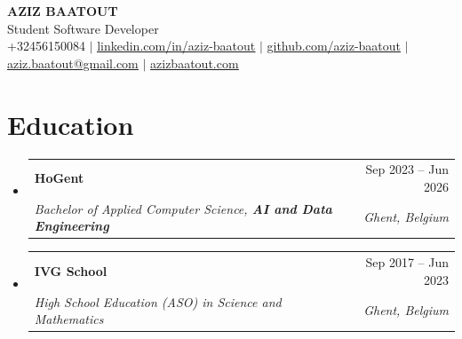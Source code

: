 \documentclass[letterpaper,11pt]{article}
\makeatletter
\newcommand{\resumeSubheading}[4]{
  \vspace{-2pt}\item
    \begin{tabular*}{0.97\textwidth}[t]{l@{\extracolsep{\fill}}r}
      \textbf{#1} & #2 \\
      \textit{\small#3} & \textit{\small #4} \\
    \end{tabular*}\vspace{-7pt}
}
\newcommand{\resumeSubHeadingListStart}{\begin{itemize}[leftmargin=0.15in, label={}]}
\newcommand{\resumeSubHeadingListEnd}{\end{itemize}}
\makeatother
\begin{document}
\begin{center}
    \textbf{\Huge \scshape AZIZ BAATOUT} \\ \vspace{1pt}
    \small Student Software Developer \\ \vspace{2pt}
    \small +32456150084 $|$ 
    \href{https://linkedin.com/in/aziz-baatout}{\underline{linkedin.com/in/aziz-baatout}} $|$ \href{https://github.com/aziz-baatout}{\underline{github.com/aziz-baatout}} $|$ \href{mailto:aziz.baatout@gmail.com}{\underline{aziz.baatout@gmail.com}} $|$ \href{https://azizbaatout.com}{\underline{azizbaatout.com}}
\end{center}

\section{Education}
  \resumeSubHeadingListStart
  \resumeSubheading
      {HoGent}{Sep 2023 -- Jun 2026}
      {Bachelor of Applied Computer Science, \textbf{AI and Data Engineering}}{Ghent, Belgium}
\vspace{5pt}
\resumeSubheading
      {IVG School}{Sep 2017 -- Jun 2023}
      {High School Education (ASO) in Science and Mathematics}{Ghent, Belgium}
  \resumeSubHeadingListEnd
\end{document}
